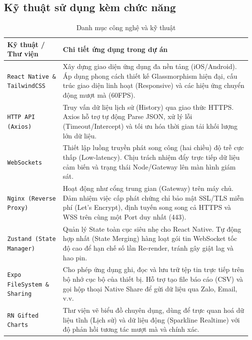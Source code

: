 \documentclass{article}
\begin{document}
\subsection{Kỹ thuật sử dụng kèm chức năng}
\begin{table}[H]
    \centering
    \renewcommand{\arraystretch}{1.5}
    \begin{tabularx}{\textwidth}{|p{4cm}|X|}
        \hline
        \textbf{Kỹ thuật / Thư viện} & \textbf{Chi tiết ứng dụng trong dự án} \\
        \hline
        \texttt{React Native \& TailwindCSS} & Xây dựng giao diện ứng dụng đa nền tảng (iOS/Android). Áp dụng phong cách thiết kế Glassmorphism hiện đại, cấu trúc giao diện linh hoạt (Responsive) và các hiệu ứng chuyển động mượt mà (60FPS). \\
        \hline
        \texttt{HTTP API (Axios)} & Truy vấn dữ liệu lịch sử (History) qua giao thức HTTPS. Axios hỗ trợ tự động Parse JSON, xử lý lỗi (Timeout/Intercept) và tối ưu hóa thời gian tải khối lượng lớn dữ liệu. \\
        \hline
        \texttt{WebSockets} & Thiết lập luồng truyền phát song công (hai chiều) độ trễ cực thấp (Low-latency). Chịu trách nhiệm đẩy trực tiếp dữ liệu cảm biến và trạng thái Node/Gateway lên màn hình giám sát. \\
        \hline
        \texttt{Nginx (Reverse Proxy)} & Hoạt động như cổng trung gian (Gateway) trên máy chủ. Đảm nhiệm việc cấp phát chứng chỉ bảo mật SSL/TLS miễn phí (Let's Encrypt), định tuyến song song cả HTTPS và WSS trên cùng một Port duy nhất (443). \\
        \hline
        \texttt{Zustand (State Manager)} & Quản lý State toàn cục siêu nhẹ cho React Native. Tự động hợp nhất (State Merging) hàng loạt gói tin WebSocket tốc độ cao để hạn chế số lần Re-render, tránh gây giật lag và hao pin. \\
        \hline
        \texttt{Expo FileSystem \& Sharing} & Cho phép ứng dụng ghi, đọc và lưu trữ tệp tin trực tiếp trên bộ nhớ cục bộ của thiết bị. Hỗ trợ tạo file báo cáo (CSV) và gọi hộp thoại Native Share để gửi dữ liệu qua Zalo, Email, v.v. \\
        \hline
        \texttt{RN Gifted Charts} & Thư viện vẽ biểu đồ chuyên dụng, dùng để trực quan hoá dữ liệu tĩnh (Lịch sử) và dữ liệu động (Sparkline Realtime) với độ phản hồi tương tác mượt mà và chính xác. \\
        \hline
    \end{tabularx}
    \caption{Danh mục công nghệ và kỹ thuật}
\end{table}
\end{document}
